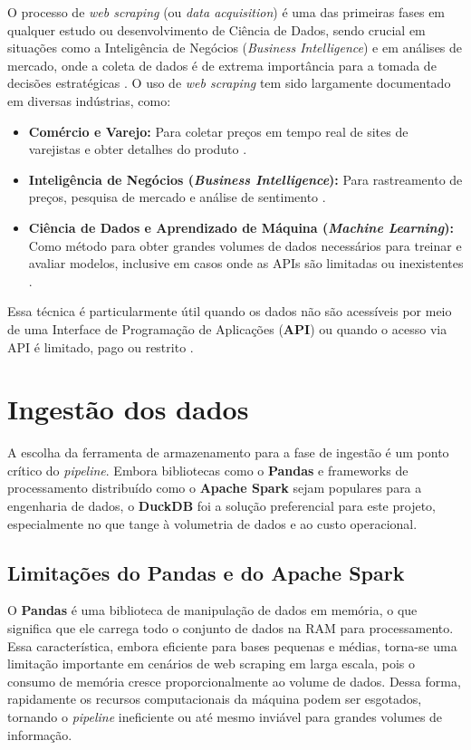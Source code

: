 O processo de \textit{web scraping} (ou \textit{data acquisition}) é uma das primeiras fases em qualquer estudo ou desenvolvimento de Ciência de Dados, sendo crucial em situações como a Inteligência de Negócios (\textit{Business Intelligence}) e em análises de mercado, onde a coleta de dados é de extrema importância para a tomada de decisões estratégicas \cite[]{khder2021web, reddi2021data}. O uso de \textit{web scraping} tem sido largamente documentado em diversas indústrias, como:
\begin{itemize}
    \item \textbf{Comércio e Varejo:} Para coletar preços em tempo real de sites de varejistas e obter detalhes do produto \cite[]{khder2021web}.
    \item \textbf{Inteligência de Negócios (\textit{Business Intelligence}):} Para rastreamento de preços, pesquisa de mercado e análise de sentimento \cite[]{khder2021web}.
    \item \textbf{Ciência de Dados e Aprendizado de Máquina (\textit{Machine Learning}):} Como método para obter grandes volumes de dados necessários para treinar e avaliar modelos, inclusive em casos onde as APIs são limitadas ou inexistentes \cite[]{khder2021web, reddi2021data}.
\end{itemize}

Essa técnica é particularmente útil quando os dados não são acessíveis por meio de uma Interface de Programação de Aplicações (\textbf{API}) ou quando o acesso via API é limitado, pago ou restrito \cite[]{khder2021web}.

\section{Ingestão dos dados}

A escolha da ferramenta de armazenamento para a fase de ingestão é um ponto crítico do \textit{pipeline}. Embora bibliotecas como o \textbf{Pandas} e frameworks de processamento distribuído como o \textbf{Apache Spark} sejam populares para a engenharia de dados, o \textbf{DuckDB} foi a solução preferencial para este projeto, especialmente no que tange à volumetria de dados e ao custo operacional.

\subsection{Limitações do Pandas e do Apache Spark}

O \textbf{Pandas} é uma biblioteca de manipulação de dados em memória, o que significa que ele carrega todo o conjunto de dados na RAM para processamento. Essa característica, embora eficiente para bases pequenas e médias, torna-se uma limitação importante em cenários de web scraping em larga escala, pois o consumo de memória cresce proporcionalmente ao volume de dados. Dessa forma, rapidamente os recursos computacionais da máquina podem ser esgotados, tornando o \textit{pipeline} ineficiente ou até mesmo inviável para grandes volumes de informação.

